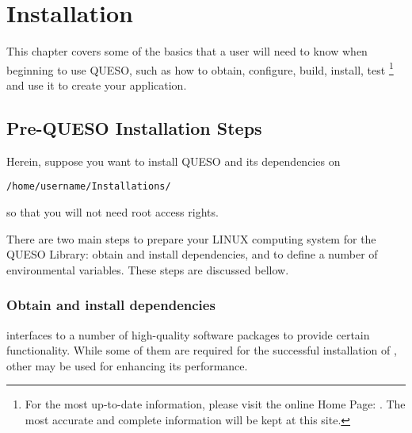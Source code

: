 \chapter{Installation}\label{ch-install}
\thispagestyle{headings}


  
This chapter covers some of the basics that a user will need to know when beginning to use QUESO, such as 
how to obtain, configure, build, install, test \Queso\footnote{For the most up-to-date information,
please visit the online \Queso{} Home Page: \Quesoweb. The most accurate and complete information will be kept at this site.}
and use it to create your application.


        
\section{Pre-QUESO Installation Steps}


Herein, suppose you want to install QUESO and its dependencies on 
\begin{center}
\texttt{/home/username/Installations/} 
\end{center}
%
so that you will not need root access rights. 

There are two main steps to prepare your LINUX computing system  for  the QUESO Library: obtain and install \Queso{} dependencies, and to define a number of environmental variables. These steps are discussed bellow.


\subsection{Obtain and install \Queso{} dependencies}

\Queso{} interfaces to a number of high-quality software packages to provide certain functionality. While some of them are required for the successful installation of \Queso{}, other may be used for enhancing its performance. 

